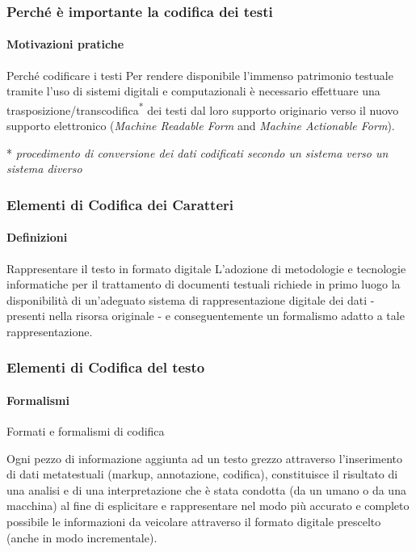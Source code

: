 \documentclass{beamer}
\begin{document}
\begin{frame}
    \frametitle{Perché è importante la codifica dei testi}
    \framesubtitle{Motivazioni pratiche}
    \addtocounter{nframe}{1}
    
    \begin{block}{Perché codificare i testi}
        Per rendere disponibile l'immenso patrimonio testuale tramite l'uso di sistemi digitali e computazionali è necessario effettuare una trasposizione/transcodifica\textsuperscript{*} dei testi dal loro supporto originario verso il nuovo supporto elettronico (\textit{Machine Readable Form} and \textit{Machine Actionable Form}).
    \end{block}

    \begin{center}
        * \textit{procedimento di conversione dei dati codificati secondo un sistema verso un sistema diverso}
    \end{center}

\end{frame}

\begin{frame}
	\frametitle{Elementi di Codifica dei Caratteri}
	\framesubtitle{Definizioni}
	\addtocounter{nframe}{1}

	\begin{block}{Rappresentare il testo in formato digitale}
		L’adozione di metodologie e tecnologie informatiche per il trattamento di documenti testuali richiede in primo luogo la disponibilità di un'adeguato sistema di rappresentazione digitale dei dati - presenti nella risorsa originale - e conseguentemente un formalismo adatto a tale rappresentazione.
	\end{block}

\end{frame}

\begin{frame}
	\frametitle{Elementi di Codifica del testo}
	\framesubtitle{Formalismi}
	\addtocounter{nframe}{1}

	\begin{block}{Formati e formalismi di codifica}

		Ogni pezzo di informazione aggiunta ad un testo grezzo attraverso l'inserimento di dati metatestuali (markup, annotazione, codifica), constituisce il risultato di una analisi e di una interpretazione che è stata condotta (da un umano o da una macchina) al fine di esplicitare e rappresentare nel modo più accurato e completo possibile le informazioni da veicolare attraverso il formato digitale prescelto (anche in modo incrementale).


	\end{block}

\end{frame}
\end{document}
